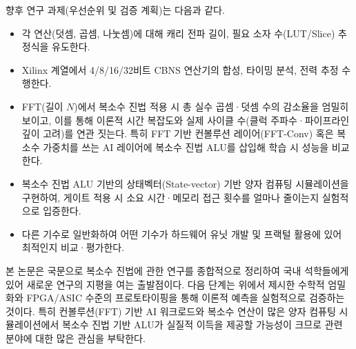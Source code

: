 \documentclass[10pt,a4paper,notitlepage]{report}
\begin{document}
\begin{multicols*}{2}
향후 연구 과제(우선순위 및 검증 계획)는 다음과 같다.
\begin{itemize}
\item 각 연산(덧셈, 곱셈, 나눗셈)에 대해 캐리 전파 길이, 필요 소자 수(LUT/Slice) 추정식을 유도한다.
\item Xilinx 계열에서 4/8/16/32비트 CBNS 연산기의 합성, 타이밍 분석, 전력 추정 수행한다.
\item FFT(길이 $N$)에서 복소수 진법 적용 시 총 실수 곱셈·덧셈 수의 감소율을 엄밀히 보이고, 이를 통해 이론적 시간 복잡도와 실제 사이클 수(클럭 주파수·파이프라인 깊이 고려)를 연관 짓는다. 특히 FFT 기반 컨볼루션 레이어(FFT-Conv) 혹은 복소수 가중치를 쓰는 AI 레이어에 복소수 진법 ALU를 삽입해 학습 시 성능을 비교한다.
\item 복소수 진법 ALU 기반의 상태벡터(State-vector) 기반 양자 컴퓨팅 시뮬레이션을 구현하여, 게이트 적용 시 소요 시간·메모리 접근 횟수를 얼마나 줄이는지 실험적으로 입증한다.
\item 다른 기수로 일반화하여 어떤 기수가 하드웨어 유닛 개발 및 프랙털 활용에 있어 최적인지 비교·평가한다.
\end{itemize}
\vspace{0.4cm}

본 논문은 국문으로 복소수 진법에 관한 연구를 종합적으로 정리하여 국내 석학들에게 있어 새로운 연구의 지평을 여는 출발점이다. 다음 단계는 위에서 제시한 수학적 엄밀화와 FPGA/ASIC 수준의 프로토타이핑을 통해 이론적 예측을 실험적으로 검증하는 것이다. 특히 컨볼루션(FFT) 기반 AI 워크로드와 복소수 연산이 많은 양자 컴퓨팅 시뮬레이션에서 복소수 진법 기반 ALU가 실질적 이득을 제공할 가능성이 크므로 관련 분야에 대한 많은 관심을 부탁한다.

\end{multicols*}
\newpage
\end{document}

